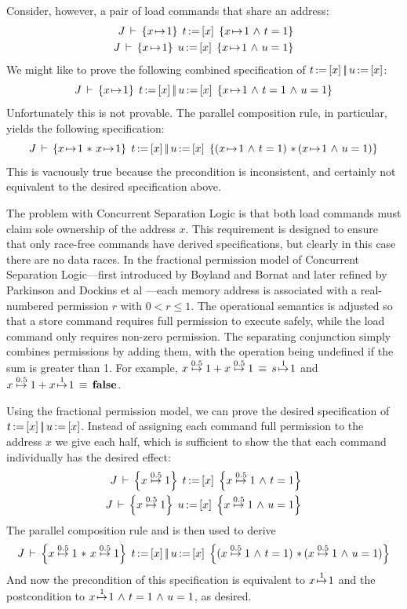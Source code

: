 \documentclass[11pt]{report}
\begin{document}
Consider, however, a pair of load commands that share an address: \begin{align*}
  \spec{J}{x \fpointsto 1}{\cload{t}{x}}{x \fpointsto 1 \conj t = 1} \\
  \spec{J}{x \fpointsto 1}{\cload{u}{x}}{x \fpointsto 1 \conj u = 1}
\end{align*}
We might like to prove the following combined specification of $t \operatorname{:\!=} \left[ x \right] \operatorname{|\!|} u \operatorname{:\!=} \left[ x \right]$: \[ J\,\vdash\,\left\lbrace x \!\mapsto\! 1 \right\rbrace\;t \operatorname{:\!=} \left[ x \right] \operatorname{|\!|} u \operatorname{:\!=} \left[ x \right]\;\left\lbrace x \!\mapsto\! 1 \operatorname{\,\wedge\,} t = 1 \operatorname{\,\wedge\,} u = 1 \right\rbrace \] Unfortunately this is not provable. The parallel composition rule, in particular, yields the following specification: \[ \spec{J}{x \fpointsto 1 \fsep x \fpointsto 1}{\cload{t}{x} \oppar \cload{u}{x}}{(x \fpointsto 1 \conj t = 1) \fsep (x \fpointsto 1 \conj u = 1)}\] This is vacuously true because the precondition is inconsistent, and certainly not equivalent to the desired specification above.

The problem with Concurrent Separation Logic is that both load commands must claim sole ownership of the address $x$. This requirement is designed to ensure that only race-free commands have derived specifications, but clearly in this case there are no data races. In the fractional permission model of Concurrent Separation Logic---first introduced by Boyland and Bornat \cite{DBLP:conf/sas/Boyland03,DBLP:conf/popl/BornatCOP05} and later refined by Parkinson and Dockins et al \cite{ParkinsonDissertation,DBLP:conf/aplas/DockinsHA09}---each memory address is associated with a real-numbered permission $r$ with $0 < r \leq 1$. The operational semantics is adjusted so that a store command requires full permission to execute safely, while the load command only requires non-zero permission. The separating conjunction simply combines permissions by adding them, with the operation being undefined if the sum is greater than 1. For example, $x \stackrel{0.5}{\!\mapsto\!} 1 + x \stackrel{0.5}{\!\mapsto\!} 1 \,\equiv\, s \stackrel{1}{\!\mapsto\!} 1$ and $x \stackrel{0.5}{\!\mapsto\!} 1 + x \stackrel{1}{\!\mapsto\!} 1 \,\equiv\, \mathbf{false}$.

Using the fractional permission model, we can prove the desired specification of $t \operatorname{:\!=} \left[ x \right] \operatorname{|\!|} u \operatorname{:\!=} \left[ x \right]$. Instead of assigning each command full permission to the address $x$ we give each half, which is sufficient to show the that each command individually has the desired effect: \begin{align*}
  \spec{J}{x \stackrel{0.5}{\fpointsto} 1}{\cload{t}{x}}{x \stackrel{0.5}{\fpointsto} 1 \conj t = 1} \\
  \spec{J}{x \stackrel{0.5}{\fpointsto} 1}{\cload{u}{x}}{x \stackrel{0.5}{\fpointsto} 1 \conj u = 1}  
\end{align*} The parallel composition rule and is then used to derive \[ \spec{J}{x \stackrel{0.5}{\fpointsto} 1 \fsep x \stackrel{0.5}{\fpointsto} 1}{\cload{t}{x}\oppar \cload{u}{x}}{(x \stackrel{0.5}{\fpointsto} 1 \conj t = 1) \fsep (x \stackrel{0.5}{\fpointsto} 1 \conj u = 1)}\] And now the precondition of this specification is equivalent to $x \stackrel{1}{\!\mapsto\!} 1$ and the postcondition to $x \stackrel{1}{\!\mapsto\!} 1 \operatorname{\,\wedge\,} t = 1 \operatorname{\,\wedge\,} u = 1$, as desired. 
\end{document}
